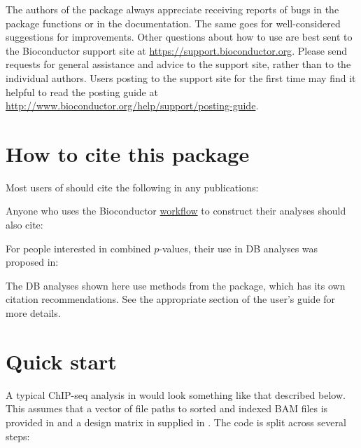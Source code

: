 \documentclass{report}\usepackage[]{graphicx}\usepackage[usenames,dvipsnames]{color}
\begin{document}
The authors of the package always appreciate receiving reports of bugs in the package functions or in the documentation. 
The same goes for well-considered suggestions for improvements. 
Other questions about how to use  are best sent to the Bioconductor support site at \url{https://support.bioconductor.org}.
Please send requests for general assistance and advice to the support site, rather than to the individual authors. 
Users posting to the support site for the first time may find it helpful to read the posting guide at \url{http://www.bioconductor.org/help/support/posting-guide}.

\section{How to cite this package}
Most users of  should cite the following in any publications:
\begin{quote}
\end{quote}
Anyone who uses the Bioconductor \href{https://www.bioconductor.org/help/workflows/chipseqDB/}{workflow} to construct their analyses should also cite:
\begin{quote}
\end{quote}
For people interested in combined $p$-values, their use in DB analyses was proposed in:
\begin{quote}
\end{quote}
The DB analyses shown here use methods from the  package, which has its own citation recommendations.
See the appropriate section of the  user's guide for more details.

\section{Quick start}
A typical ChIP-seq analysis in  would look something like that described below. 
This assumes that a vector of file paths to sorted and indexed BAM files is provided in  and a design matrix in supplied in .
The code is split across several steps:
\end{document}
